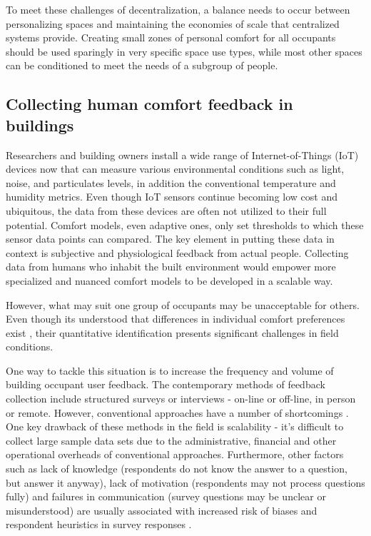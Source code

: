 \documentclass[]{interact}
\theoremstyle{plain}%
\theoremstyle{definition}
\theoremstyle{remark}
\begin{document}
To meet these challenges of decentralization, a balance needs to occur between personalizing spaces and maintaining the economies of scale that centralized systems provide. Creating small zones of personal comfort for all occupants should be used sparingly in very specific space use types, while most other spaces can be conditioned to meet the needs of a subgroup of people. 




\subsection{Collecting human comfort feedback in buildings}
Researchers and building owners install a wide range of Internet-of-Things (IoT) devices now that can measure various environmental conditions such as light, noise, and particulates levels, in addition the conventional temperature and humidity metrics. 
Even though IoT sensors continue becoming low cost and ubiquitous, the data from these devices are often not utilized to their full potential. Comfort models, even adaptive ones, only set thresholds to which these sensor data points can compared. The key element in putting these data in context is subjective and physiological feedback from actual people. Collecting data from humans who inhabit the built environment would empower more specialized and nuanced comfort models to be developed in a scalable way.

However, what may suit one group of occupants may be unacceptable for others. Even though its understood that differences in individual comfort preferences exist \cite{WANG2018181}, their quantitative identification presents significant challenges in field conditions.

One way to tackle this situation is to increase the frequency and volume of building occupant user feedback. The contemporary methods of feedback collection include structured surveys or interviews - on-line or off-line, in person or remote. However, conventional approaches have a number of shortcomings  \cite{oecd}. One key drawback of these methods in the field is scalability - it’s difficult to collect large sample data sets due to the administrative, financial and other operational overheads of conventional approaches. Furthermore, other factors such as lack of knowledge (respondents do not know the answer to a question, but answer it anyway), lack of motivation (respondents may not process questions fully) and failures in communication (survey questions may be unclear or misunderstood) are usually associated with increased risk of biases and respondent heuristics in survey responses  \cite{bradburn2004asking}.
\end{document}
